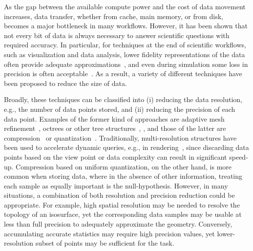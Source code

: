 As the gap between the available compute power and the cost of data movement
increases, data transfer, whether from cache, main memory, or from disk,
becomes a major bottleneck in many workflows. However, it has been shown that
not every bit of data is always necessary to answer scientific questions with
required accuracy. In particular, for techniques at the end of scientific
workflows, such as visualization and data analysis, lower fidelity
representations of the data often provide adequate
approximations~\cite{woodring2011,covra2012,compression_sim2013}, and even
during simulation some loss in precision is often
acceptable~\cite{compression_sim2013,doi:10.1177/1094342018762036}.  As a
result, a variety of different techniques have been proposed to reduce the size
of data. 

Broadly, these techniques can be classified into (i) reducing the data
resolution, e.g., the number of data points stored, and (ii) reducing the
precision of each data point.  Examples of the former kind of approaches are
adaptive mesh refinement~\cite{amr1989}, octrees or other tree
structures~\cite{hierarchical1984}, , and those of the
latter are compression~\cite{fpzip,isabela,zfp2014,sz} or
quantization~\cite{vq1992,compression_domain2003,sqe}.  Traditionally,
multi-resolution structures have been used to accelerate dynamic queries, e.g.,
in rendering~\cite{multires_octree1999}, since discarding data points based on
the view point or data complexity can result in significant speed-up.
Compression based on uniform quantization, on the other hand, is more common
when storing data, where in the absence of other information, treating each
sample as equally important is the null-hypothesis. However, in many
situations, a combination of both resolution and precision reduction could be
appropriate.  For example, high spatial resolution may be needed to resolve the
topology of an isosurface, yet the corresponding data samples may be usable at
less than full precision to adequately approximate the geometry.  Conversely,
accumulating accurate statistics may require high precision values, yet
lower-resolution subset of points may be sufficient for the task. 

